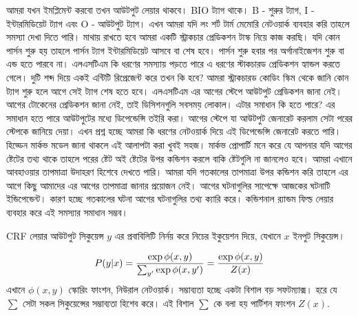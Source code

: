 \documentclass{article}[book]
\begin{document}
\begin{comment}

\begin{figure}[htbp] %
   \centering
    
   \caption{রিকারেন্ট নেটওয়ার্ক সিকুয়েন্স ট্যাগিং}
   \label{fig:cbow}
\end{figure} 

\end{comment}

আমরা যখন ইমপ্লিমেন্ট করবো তখন আউটপুট লেয়ার থাকবে। BIO ট্যাগ থাকে। B - শুরুর ট্যাগ, I - ইন্টারমিডিয়েট ট্যাগ এবং O - আউটপুট ট্যাগ। এখন আমরা যদি লং শর্ট টার্ম মেমোরি নেটওয়ার্ক ব্যবহার করি তাহলে সমস্যা দেখা দিতে পারি। মাথায় রাখতে হবে আমরা একটি স্ট্রাকচার প্রেডিকশন টাস্ক নিয়ে কাজ করছি। যদি কোন পার্সন শুরু হয় তাহলে পার্সন ট্যাগ ইন্টারমিডিয়েট আসবে বা শেষ হবে। পার্সন শুরু হবার পর অর্গানাইজেশন শুরু বা এন্ড হতে পারবে না। এলএসটিএম কি ধরণের সমস্যায় পড়তে পারে এ ধরণের স্টাকচারড প্রেডিকশন হ্যান্ডল করতে গেলে। দুটি শব্দ দিয়ে একই এন্টিটি রিপ্রেজেন্ট করে তখন কি হবে? আমরা স্ট্রাকচারড কোডিং স্কিম থেকে জানি কোন ট্যাগ শুরু হলে আগে সেই ট্যাগ শেষ হতে হবে। এলএসটিএম এর আগের স্টেপে আউটপুট প্রেডিকশন জানা নেই। আগের টোকেনের প্রেডিকশন জানা নেই, তাই ডিসিশনগুলি সবসময় লোকাল। এটার সমাধান কি হতে পারে? এর সমাধান হতে পারে আউটপুটের মধ্যে ডিপেন্ডেন্সি তইরি করা। আগের স্টেপে যা আউটপুট জেনারেট করলাম সেটা পরের স্টেপকে জানিয়ে দেয়া। এখন প্রশ্ন হচ্ছে আমরা কি ধরণের নেটওয়ার্ক দিয়ে এই ডিপেন্ডেন্সি জেনারেট করতে পারি। হিড্ডেন মার্কভ মডেল জানা থাকলে এই আলাপটা করা খুবই সহজ। মার্কভ প্রোপার্টি মনে করে যে আপনার যদি আগের ষ্টেটের তথ্য থাকে তাহলে পরের ষ্টেট অই ষ্টেটের উপর কন্ডিশন করলে বাকি ষ্টেটগুলি না জানলেও হবে। আমরা এখানে আবহাওয়ার তাপমাত্রা উদাহরণ হিশেবে দেখতে পারি। আমরা যদি গতকালের তাপমাত্রা উপর কন্ডিশন করি তাহলে এর আগে কিছু আমাদের এর আগের তাপমাত্রা জানার প্রয়োজন নেই। আগের ঘটনাগুলির সাপেক্ষে আজকের ঘটনাটি ইন্ডিপেন্ডেন্ট। কারণ হচ্ছে গতকালের ঘটনা আগের ঘটনাগুলির তথ্য ক্যারি করে। কন্ডিশনাল র‍্যান্ডম ফিল্ড লেয়ার ব্যবহার করে এই সমস্যার সমাধান সম্ভব। 

CRF লেয়ার আউটপুট সিকুয়েন্স $y$ এর প্রবাবিলিটি নির্নয় করে নিচের ইকুয়েশন দিয়ে, যেখানে $x$ ইনপুট সিকুয়েন্স। 
 
\begin{equation} %
P(y|x) =  \frac{\exp \phi(x, y)}{\sum_{y^\prime} \exp \phi(x,y^\prime)} \\
= \frac{\exp \phi(x, y)}{Z(x)} \\
\end{equation}
এখানে $\phi(x,y)$ স্কোরিং ফাংশন,  নিউরাল নেটওয়ার্ক। সম্ভাব্যতা হচ্ছে একটা বিশাল বড় সফটম্যাক্স। হরে যে $\sum$ সেটা সকল সিকুয়েন্সের সম্ভাব্যতা হিশেব করে। এই বিশাল $\sum$ কে বলা হয় পার্টিশন ফাংশন $Z(x)$.
\end{document}
